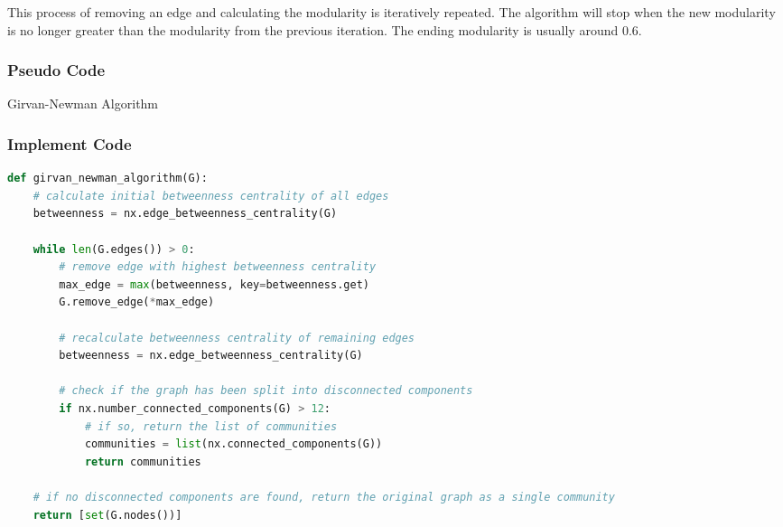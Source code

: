 This process of removing an edge and calculating the modularity is iteratively repeated. The algorithm will stop when the new modularity is no longer greater than the modularity from the previous iteration. The ending modularity is usually around 0.6.

\subsubsection{Pseudo Code}
\begin{algorithm}
        \SetAlgoLined


    \BlankLine


    \caption{Girvan-Newman Algorithm}
\end{algorithm}

\subsubsection{Implement Code}
\begin{lstlisting}[language=Python]
def girvan_newman_algorithm(G):
    # calculate initial betweenness centrality of all edges
    betweenness = nx.edge_betweenness_centrality(G)

    while len(G.edges()) > 0:
        # remove edge with highest betweenness centrality
        max_edge = max(betweenness, key=betweenness.get)
        G.remove_edge(*max_edge)

        # recalculate betweenness centrality of remaining edges
        betweenness = nx.edge_betweenness_centrality(G)

        # check if the graph has been split into disconnected components
        if nx.number_connected_components(G) > 12:
            # if so, return the list of communities
            communities = list(nx.connected_components(G))
            return communities

    # if no disconnected components are found, return the original graph as a single community
    return [set(G.nodes())]

\end{lstlisting}

